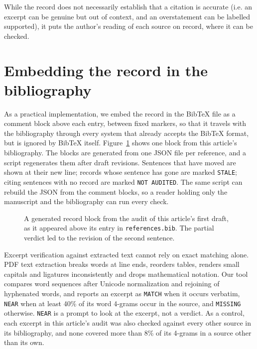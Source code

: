 \documentclass[11pt]{article}
\begin{document}
While the record does not necessarily establish that a citation is accurate (i.e. an excerpt can be genuine but out of context, and an overstatement can be labelled supported), it puts the author's reading of each source on record, where it can be checked.

\section{Embedding the record in the bibliography}

As a practical implementation, we embed the record in the BibTeX file as a comment block above each entry, between fixed markers, so that it travels with the bibliography through every system that already accepts the BibTeX format, but is ignored by BibTeX itself. Figure~\ref{fig:example} shows one block from this article's bibliography. The blocks are generated from one JSON file per reference, and a script regenerates them after draft revisions. Sentences that have moved are shown at their new line; records whose sentence has gone are marked \texttt{STALE}; citing sentences with no record are marked \texttt{NOT AUDITED}. The same script can rebuild the JSON from the comment blocks, so a reader holding only the manuscript and the bibliography can run every check.

\begin{figure}[t]
\centering
{}
\caption{A generated record block from the audit of this article's first draft, as it appeared above its entry in \texttt{references.bib}. The partial verdict led to the revision of the second sentence.}
\label{fig:example}
\end{figure}

Excerpt verification against extracted text cannot rely on exact matching alone. PDF text extraction breaks words at line ends, reorders tables, renders small capitals and ligatures inconsistently and drops mathematical notation. Our tool compares word sequences after Unicode normalization and rejoining of hyphenated words, and reports an excerpt as \texttt{MATCH} when it occurs verbatim, \texttt{NEAR} when at least 40\% of its word 4-grams occur in the source, and \texttt{MISSING} otherwise. \texttt{NEAR} is a prompt to look at the excerpt, not a verdict. As a control, each excerpt in this article's audit was also checked against every other source in its bibliography, and none covered more than 8\% of its 4-grams in a source other than its own.
\end{document}
